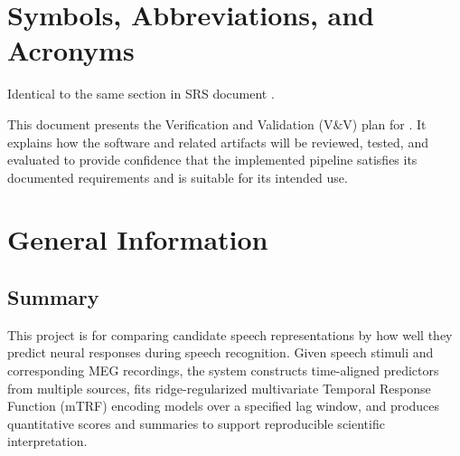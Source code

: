 \documentclass[12pt, titlepage]{article}
\begin{document}
\newpage

\section{Symbols, Abbreviations, and Acronyms}

Identical to the same section in SRS document \citep{SRS}.




\newpage


This document presents the Verification and Validation (V\&V) plan for \progname{}. 
It explains how the software and related artifacts will be reviewed, tested, and evaluated to provide confidence that the implemented pipeline satisfies its documented requirements and is suitable for its intended use.

\section{General Information}


\subsection{Summary}


This project is for comparing candidate speech representations by how well they predict neural responses during speech recognition. 
Given speech stimuli and corresponding MEG recordings, the system constructs time-aligned predictors from multiple
sources, fits ridge-regularized multivariate Temporal Response Function (mTRF) encoding models over a specified lag window, and produces quantitative scores and summaries to support reproducible scientific interpretation.
\end{document}
